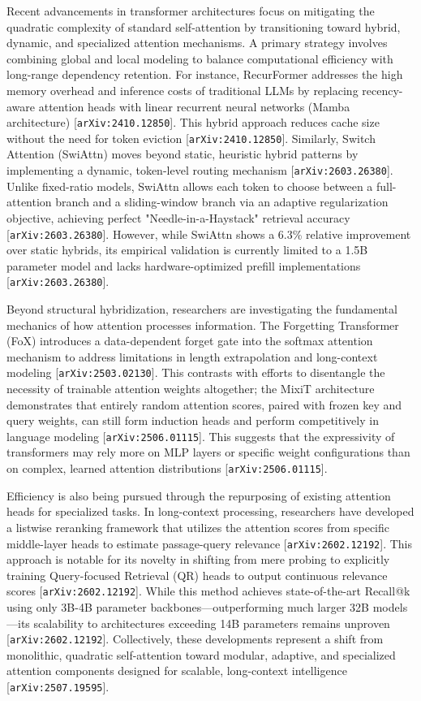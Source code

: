 \documentclass[11pt]{article}
\begin{document}
Recent advancements in transformer architectures focus on mitigating the quadratic complexity of standard self-attention by transitioning toward hybrid, dynamic, and specialized attention mechanisms. A primary strategy involves combining global and local modeling to balance computational efficiency with long-range dependency retention. For instance, RecurFormer addresses the high memory overhead and inference costs of traditional LLMs by replacing recency-aware attention heads with linear recurrent neural networks (Mamba architecture) [\texttt{arXiv:2410.12850}]. This hybrid approach reduces cache size without the need for token eviction [\texttt{arXiv:2410.12850}]. Similarly, Switch Attention (SwiAttn) moves beyond static, heuristic hybrid patterns by implementing a dynamic, token-level routing mechanism [\texttt{arXiv:2603.26380}]. Unlike fixed-ratio models, SwiAttn allows each token to choose between a full-attention branch and a sliding-window branch via an adaptive regularization objective, achieving perfect "Needle-in-a-Haystack" retrieval accuracy [\texttt{arXiv:2603.26380}]. However, while SwiAttn shows a 6.3\% relative improvement over static hybrids, its empirical validation is currently limited to a 1.5B parameter model and lacks hardware-optimized prefill implementations [\texttt{arXiv:2603.26380}].

Beyond structural hybridization, researchers are investigating the fundamental mechanics of how attention processes information. The Forgetting Transformer (FoX) introduces a data-dependent forget gate into the softmax attention mechanism to address limitations in length extrapolation and long-context modeling [\texttt{arXiv:2503.02130}]. This contrasts with efforts to disentangle the necessity of trainable attention weights altogether; the MixiT architecture demonstrates that entirely random attention scores, paired with frozen key and query weights, can still form induction heads and perform competitively in language modeling [\texttt{arXiv:2506.01115}]. This suggests that the expressivity of transformers may rely more on MLP layers or specific weight configurations than on complex, learned attention distributions [\texttt{arXiv:2506.01115}].

Efficiency is also being pursued through the repurposing of existing attention heads for specialized tasks. In long-context processing, researchers have developed a listwise reranking framework that utilizes the attention scores from specific middle-layer heads to estimate passage-query relevance [\texttt{arXiv:2602.12192}]. This approach is notable for its novelty in shifting from mere probing to explicitly training Query-focused Retrieval (QR) heads to output continuous relevance scores [\texttt{arXiv:2602.12192}]. While this method achieves state-of-the-art Recall@k using only 3B-4B parameter backbones—outperforming much larger 32B models—its scalability to architectures exceeding 14B parameters remains unproven [\texttt{arXiv:2602.12192}]. Collectively, these developments represent a shift from monolithic, quadratic self-attention toward modular, adaptive, and specialized attention components designed for scalable, long-context intelligence [\texttt{arXiv:2507.19595}].
\end{document}

